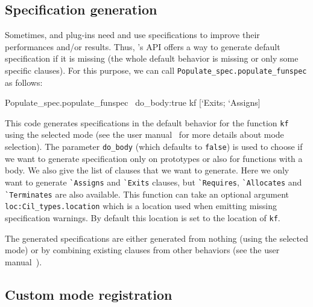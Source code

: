 \subsection{Specification generation}

Sometimes, \framac and plug-ins need and use \acsl specifications to improve
their performances and/or results. Thus, \framac's API offers a way to generate
default specification if it is missing (the whole default behavior is missing or
only some specific clauses). For this purpose, we can call
\verb+Populate_spec.populate_funspec+%
 as follows:

\begin{ocamlcode}
Populate_spec.populate_funspec ~do_body:true kf [`Exits; `Assigns]
\end{ocamlcode}

This code generates specifications in the default behavior for the function
\verb+kf+ using the selected mode (see the user manual~\cite{userman} for more
details about mode selection). The parameter \verb+do_body+ (which defaults to
\verb+false+) is used to choose if we want to generate specification only on
prototypes or also for functions with a body. We also give the list of clauses
that we want to generate. Here we only want to generate
\verb+`Assigns+ and \verb+`Exits+ clauses, but \verb+`Requires+,
\verb+`Allocates+ and \verb+`Terminates+ are also available. This function can
take an optional argument \verb+loc:Cil_types.location+ which is a location
used when emitting missing specification warnings. By default this location is
set to the location of \verb+kf+.

The generated specifications are either generated from nothing (using the
selected mode) or by combining existing clauses from other behaviors (see the
user manual~\cite{userman}).

\subsection{Custom mode registration}

